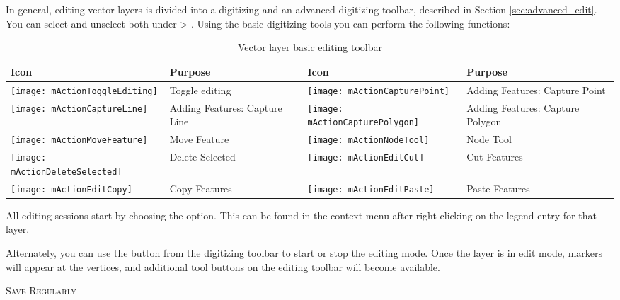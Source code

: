 In general, editing vector layers is divided into a digitizing and an advanced
digitizing toolbar, described in Section \ref{sec:advanced_edit}. You can
select and unselect both under  > .
Using the basic digitizing tools you can perform the following functions:

\begin{table}[h]
\centering
\caption{Vector layer basic editing toolbar}\label{tab:vector_editing}\medskip
\small
\begin{tabular}{|l|p{6.9cm}|l|p{6.9cm}|}
\hline \textbf{Icon} & \textbf{Purpose} & \textbf{Icon} & \textbf{Purpose} \\
\hline \texttt{[image: mActionToggleEditing]}
   & Toggle editing
   & \texttt{[image: mActionCapturePoint]}
   & Adding Features: Capture Point \\
\hline \texttt{[image: mActionCaptureLine]}
   & Adding Features: Capture Line
   & \texttt{[image: mActionCapturePolygon]}
   & Adding Features: Capture Polygon \\
\hline \texttt{[image: mActionMoveFeature]}
   & Move Feature
   & \texttt{[image: mActionNodeTool]}
   & Node Tool \\ 
\hline \texttt{[image: mActionDeleteSelected]}
   & Delete Selected
   & \texttt{[image: mActionEditCut]}
   & Cut Features \\
\hline \texttt{[image: mActionEditCopy]}
   & Copy Features
   & \texttt{[image: mActionEditPaste]} 
   & Paste Features \\
\hline
\end{tabular}
\end{table}

All editing sessions start by choosing the
 option.
This can be found in the context menu after right clicking on the legend
entry for that layer.

Alternately, you can use the 
 button from the digitizing
toolbar to start or stop the editing mode. Once the
layer is in edit mode, markers will appear at the vertices, and additional
tool buttons on the editing toolbar will become available.

\begin{Tip}[ht]\caption{\textsc{Save Regularly}}
\end{Tip}

